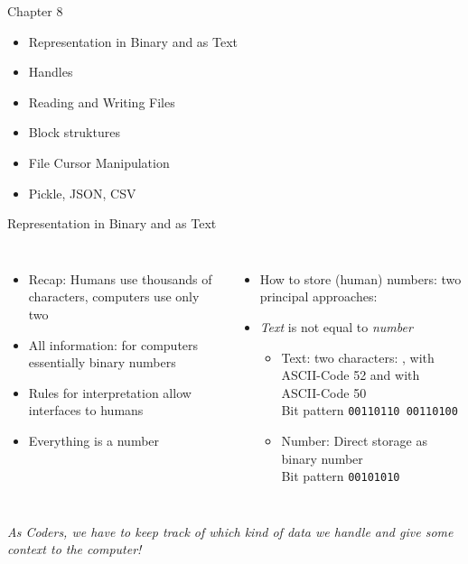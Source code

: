 
\begin{frame}[fragile]{Chapter 8}
%
\begin{itemize}
\item Representation in Binary and as Text
\item Handles
\item Reading and Writing Files
\item Block struktures
\item File Cursor Manipulation
\item Pickle, JSON, CSV
\end{itemize}
%
\end{frame}


\begin{frame}[fragile]{Representation in Binary and as Text}
%
\begin{columns}[T]
\begin{itemize}
\item Recap: Humans use thousands of characters, computers use only two
\item All information: for computers essentially binary numbers
\item Rules for interpretation allow interfaces to humans
\item[\Thus] Everything is a number
\end{itemize}
%
\begin{itemize}
\item How to store (human) numbers: two principal approaches:
\item \emph{Text}  is not equal to \emph{number} 
	\begin{itemize}
	\item Text: two characters: , with ASCII-Code 52 and  with ASCII-Code 50\\
		Bit pattern \texttt{00110110 00110100}
	\item Number: Direct storage as binary number\\
		Bit pattern \texttt{00101010}
	\end{itemize}
\end{itemize}
\end{columns}
%
\begin{center}
	\begin{large}
	\Thus \emph{As Coders, we have to keep track of which kind of data we handle and give some context to the computer!}
	\end{large}
\end{center}
%
\end{frame}

